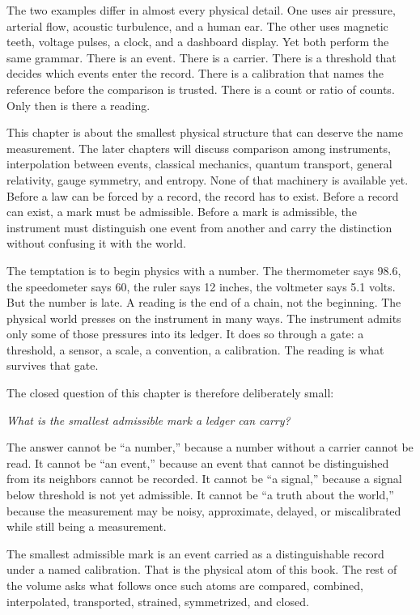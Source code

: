 \begin{chapteressay}
The two examples differ in almost every physical detail. One uses air pressure,
arterial flow, acoustic turbulence, and a human ear. The other uses magnetic
teeth, voltage pulses, a clock, and a dashboard display. Yet both perform the
same grammar. There is an event. There is a carrier. There is a threshold that
decides which events enter the record. There is a calibration that names the
reference before the comparison is trusted. There is a count or ratio of counts.
Only then is there a reading.

This chapter is about the smallest physical structure that can deserve the name
measurement. The later chapters will discuss comparison among instruments,
interpolation between events, classical mechanics, quantum transport, general
relativity, gauge symmetry, and entropy. None of that machinery is available
yet. Before a law can be forced by a record, the record has to exist. Before a
record can exist, a mark must be admissible. Before a mark is admissible, the
instrument must distinguish one event from another and carry the distinction
without confusing it with the world.

The temptation is to begin physics with a number. The thermometer says 98.6, the
speedometer says 60, the ruler says 12 inches, the voltmeter says 5.1 volts. But
the number is late. A reading is the end of a chain, not the beginning. The
physical world presses on the instrument in many ways. The instrument admits
only some of those pressures into its ledger. It does so through a gate: a
threshold, a sensor, a scale, a convention, a calibration. The reading is what
survives that gate.

The closed question of this chapter is therefore deliberately small:

\begin{center}
\emph{What is the smallest admissible mark a ledger can carry?}
\end{center}

The answer cannot be ``a number,'' because a number without a carrier cannot be
read. It cannot be ``an event,'' because an event that cannot be distinguished
from its neighbors cannot be recorded. It cannot be ``a signal,'' because a
signal below threshold is not yet admissible. It cannot be ``a truth about the
world,'' because the measurement may be noisy, approximate, delayed, or
miscalibrated while still being a measurement.

The smallest admissible mark is an event carried as a distinguishable record
under a named calibration. That is the physical atom of this book. The rest of
the volume asks what follows once such atoms are compared, combined,
interpolated, transported, strained, symmetrized, and closed.

\end{chapteressay}

